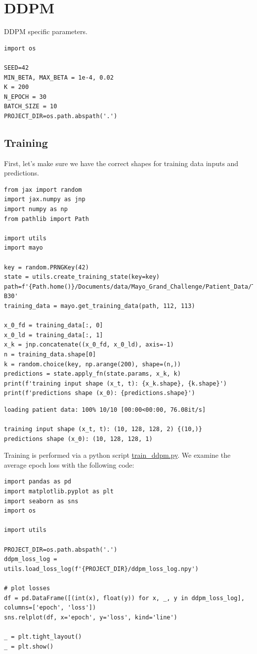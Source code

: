 \documentclass[a4paper, 11pt]{article}
\begin{document}
\section{DDPM}
\label{sec:orgcf0b9af}
DDPM specific parameters.
\begin{verbatim}
import os

SEED=42
MIN_BETA, MAX_BETA = 1e-4, 0.02
K = 200
N_EPOCH = 30
BATCH_SIZE = 10
PROJECT_DIR=os.path.abspath('.')
\end{verbatim}

\subsection{Training}
\label{sec:org7f3233a}
First, let's make sure we have the correct shapes for training data inputs and predictions.
\begin{verbatim}
from jax import random
import jax.numpy as jnp
import numpy as np
from pathlib import Path

import utils
import mayo

key = random.PRNGKey(42)
state = utils.create_training_state(key=key)
path=f'{Path.home()}/Documents/data/Mayo_Grand_Challenge/Patient_Data/Training_Image_Data/3mm B30'
training_data = mayo.get_training_data(path, 112, 113)

x_0_fd = training_data[:, 0]
x_0_ld = training_data[:, 1]
x_k = jnp.concatenate((x_0_fd, x_0_ld), axis=-1)
n = training_data.shape[0]
k = random.choice(key, np.arange(200), shape=(n,))
predictions = state.apply_fn(state.params, x_k, k)
print(f'training input shape (x_t, t): {x_k.shape}, {k.shape}')
print(f'predictions shape (x_0): {predictions.shape}')
\end{verbatim}

\begin{verbatim}
loading patient data: 100% 10/10 [00:00<00:00, 76.08it/s]

training input shape (x_t, t): (10, 128, 128, 2) {(10,)}
predictions shape (x_0): (10, 128, 128, 1)
\end{verbatim}

Training is performed via a python script \url{train\_ddpm.py}. We examine the average epoch loss with the following code:
\begin{verbatim}
import pandas as pd
import matplotlib.pyplot as plt
import seaborn as sns
import os

import utils

PROJECT_DIR=os.path.abspath('.')
ddpm_loss_log = utils.load_loss_log(f'{PROJECT_DIR}/ddpm_loss_log.npy')

# plot losses
df = pd.DataFrame([(int(x), float(y)) for x, _, y in ddpm_loss_log], columns=['epoch', 'loss'])
sns.relplot(df, x='epoch', y='loss', kind='line')

_ = plt.tight_layout()
_ = plt.show()
\end{verbatim}
\end{document}
